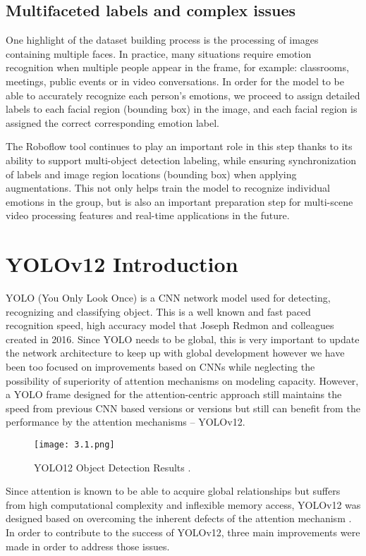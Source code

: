 \documentclass[a4paper,13pt]{report}
\begin{document}
\subsection{Multifaceted labels and complex issues}
One highlight of the dataset building process is the processing of images containing multiple faces. In practice, many situations require emotion recognition when multiple people appear in the frame, for example: classrooms, meetings, public events or in video conversations. In order for the model to be able to accurately recognize each person's emotions, we proceed to assign detailed labels to each facial region (bounding box) in the image, and each facial region is assigned the correct corresponding emotion label.

The Roboflow tool continues to play an important role in this step thanks to its ability to support multi-object detection labeling, while ensuring synchronization of labels and image region locations (bounding box) when applying augmentations. This not only helps train the model to recognize individual emotions in the group, but is also an important preparation step for multi-scene video processing features and real-time applications in the future.

\section{YOLOv12 Introduction}
YOLO (You Only Look Once) is a CNN network model used for detecting, recognizing and classifying object. This is a well known and fast paced recognition speed, high accuracy model that Joseph Redmon and colleagues created in 2016. Since YOLO needs to be global, this is very important to update the network architecture to keep up with global development however we have been too focused on improvements based on CNNs while neglecting the possibility of superiority of attention mechanisms on modeling capacity. However, a YOLO frame designed for the attention-centric approach still maintains the speed from previous CNN based versions or versions but still can benefit from the performance by the attention mechanisms – YOLOv12.

\begin{figure}[H]
  \centering
  \texttt{[image: 3.1.png]}
  \caption{YOLO12 Object Detection Results \cite{sharma2025}. }
  \label{fig:method}
\end{figure}

Since attention is known to be able to acquire global relationships but suffers from high computational complexity and inflexible memory access, YOLOv12 was designed based on overcoming the inherent defects of the attention mechanism \cite{roboflow2025}. In order to contribute to the success of YOLOv12, three main improvements were made in order to address those issues.
\end{document}
